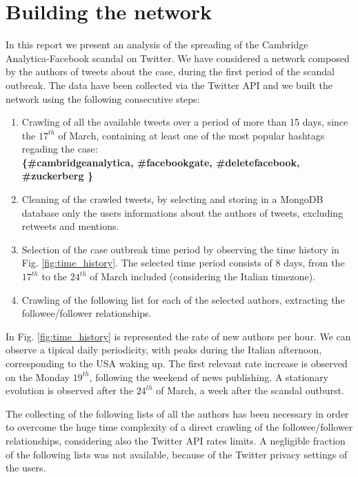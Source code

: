 \documentclass[11pt, twoside]{report}
\begin{document}
    \chapter{Building the network}
    In this report we present an analysis of the spreading of the Cambridge Analytica-Facebook scandal on Twitter.
    We have considered a network composed by the authors of tweets about the case, during the first period of the scandal outbreak. The data have been collected via the Twitter API and we built the network using the following consecutive steps:
    \begin{enumerate}
    \item Crawling of all the available tweets over a period of more than 15 days, since the $17^{th}$ of March, containing at least one of the most popular hashtags regading the case:\\
    \textbf{  \{\#cambridgeanalytica, \#facebookgate, \#deletefacebook, \#zuckerberg \} }
      
    \item Cleaning of the crawled tweets, by selecting and storing in a MongoDB database only the users informations about the authors of tweets, excluding retweets and mentions.
    \item Selection of the case outbreak time period by observing the time history in Fig. \ref{fig:time_history}. The selected time period consists of 8 days, from the $17^{th}$ to the $24^{th}$ of March included (considering the Italian timezone). 
      
    \item Crawling of the following list for each of the selected authors, extracting the followee/follower relationships.
    \end{enumerate}
    In Fig. \ref{fig:time_history} is represented the rate of new authors per hour. %
    We can observe a tipical daily periodicity, with peaks during the Italian afternoon, corresponding to the USA waking up.
    The first relevant rate increase is observed on the Monday $19^{th}$, following the weekend of news publishing. A stationary evolution is observed after the $24^{th}$ of March, a week after the scandal outburst.

    The collecting of the following lists of all the authors has been necessary in order to overcome the huge time complexity of a direct crawling of the
    followee/follower relationships, considering also the Twitter API rates limits. A negligible fraction of the following lists was not available, because of the Twitter privacy settings of the users.
\end{document}
